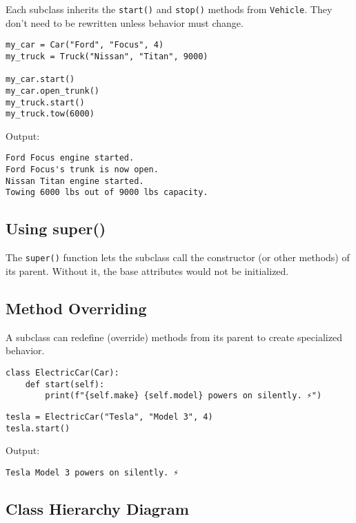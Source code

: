 Each subclass inherits the \texttt{start()} and \texttt{stop()} methods from
\texttt{Vehicle}. They don’t need to be rewritten unless behavior must change.

\begin{verbatim}
my_car = Car("Ford", "Focus", 4)
my_truck = Truck("Nissan", "Titan", 9000)

my_car.start()
my_car.open_trunk()
my_truck.start()
my_truck.tow(6000)
\end{verbatim}

Output:
\begin{verbatim}
Ford Focus engine started.
Ford Focus's trunk is now open.
Nissan Titan engine started.
Towing 6000 lbs out of 9000 lbs capacity.
\end{verbatim}

\subsection*{Using super()}

The \texttt{super()} function lets the subclass call the constructor (or other methods)
of its parent. Without it, the base attributes would not be initialized.

\subsection*{Method Overriding}

A subclass can redefine (override) methods from its parent to create specialized behavior.

\begin{verbatim}
class ElectricCar(Car):
    def start(self):
        print(f"{self.make} {self.model} powers on silently. ⚡")
\end{verbatim}

\begin{verbatim}
tesla = ElectricCar("Tesla", "Model 3", 4)
tesla.start()
\end{verbatim}

Output:
\begin{verbatim}
Tesla Model 3 powers on silently. ⚡
\end{verbatim}

\subsection*{Class Hierarchy Diagram}

\begin{center}
\end{center}


